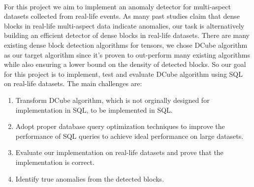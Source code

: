 \paragraph{} For this project we aim to implement an anomaly detector for multi-aspect datasets collected from real-life events. As many past studies claim that dense blocks in real-life multi-aspect data indicate anomalies,
our task is alternatively building an efficient detector of dense blocks in real-life datasets. There are many existing dense block detection algorithms for tensors, we chose DCube algorithm as our target algorithm since
it's proven to out-perform many existing algorithms while also ensuring a lower bound on the density of detected blocks. So our goal for this project is to implement, test and evaluate DCube algorithm using SQL on real-life datasets.
The main challenges are:
\begin{enumerate}
\item Transform DCube algorithm, which is not orginally designed for implementation in SQL, to be implemented in SQL.
\item Adopt proper database query optimization techniques to improve the performance of SQL queries to achieve ideal performance on large datasets.
\item Evaluate our implementation on real-life datasets and prove that the implementation is correct.
\item Identify true anomalies from the detected blocks.
\end{enumerate}